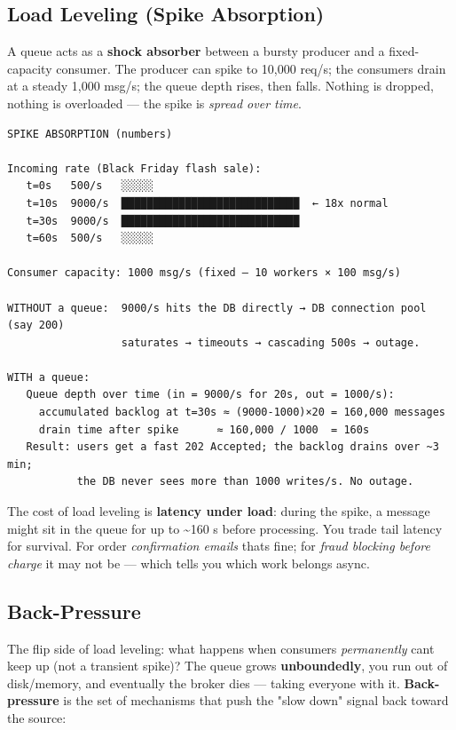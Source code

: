 \documentclass[11pt]{article}
\begin{document}
\subsection{Load Leveling (Spike Absorption)}\label{load-leveling-spike-absorption}

A queue acts as a \textbf{shock absorber} between a bursty producer and a fixed-capacity consumer. The producer can spike to 10,000 req/s; the consumers drain at a steady 1,000 msg/s; the queue depth rises, then falls. Nothing is dropped, nothing is overloaded --- the spike is \emph{spread over time}.

\setcodelang{}

\begin{verbatim}
SPIKE ABSORPTION (numbers)

Incoming rate (Black Friday flash sale):
   t=0s   500/s   ░░░░░
   t=10s  9000/s  ████████████████████████████  ← 18x normal
   t=30s  9000/s  ████████████████████████████
   t=60s  500/s   ░░░░░

Consumer capacity: 1000 msg/s (fixed — 10 workers × 100 msg/s)

WITHOUT a queue:  9000/s hits the DB directly → DB connection pool (say 200)
                  saturates → timeouts → cascading 500s → outage.

WITH a queue:
   Queue depth over time (in = 9000/s for 20s, out = 1000/s):
     accumulated backlog at t=30s ≈ (9000-1000)×20 = 160,000 messages
     drain time after spike      ≈ 160,000 / 1000  = 160s
   Result: users get a fast 202 Accepted; the backlog drains over ~3 min;
           the DB never sees more than 1000 writes/s. No outage.
\end{verbatim}

The cost of load leveling is \textbf{latency under load}: during the spike, a message might sit in the queue for up to \textasciitilde160 s before processing. You trade tail latency for survival. For order \emph{confirmation emails} that\textquotesingle s fine; for \emph{fraud blocking before charge} it may not be --- which tells you which work belongs async.

\subsection{Back-Pressure}\label{back-pressure}

The flip side of load leveling: what happens when consumers \emph{permanently} can\textquotesingle t keep up (not a transient spike)? The queue grows \textbf{unboundedly}, you run out of disk/memory, and eventually the broker dies --- taking everyone with it. \textbf{Back-pressure} is the set of mechanisms that push the "slow down" signal back toward the source:
\end{document}
